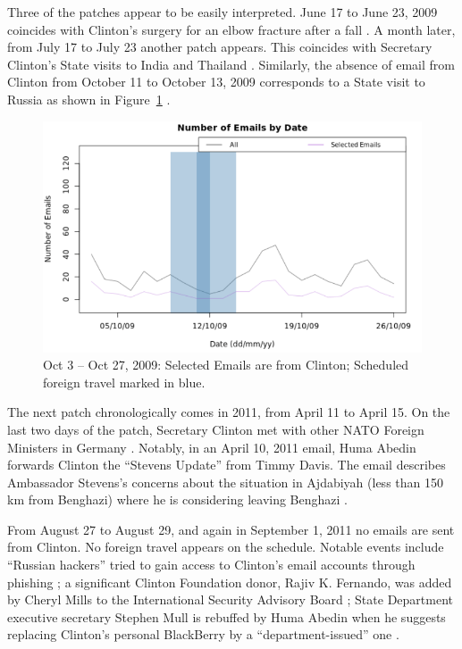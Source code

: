 \documentclass[journal]{vgtc}                %
\begin{document}
Three of the patches appear to be easily interpreted.   June 17 to June 23, 2009 coincides with Clinton's surgery for an elbow fracture after a fall \cite{ClintonFracture2009}.  A month later, from July 17 to July 23 another patch appears.  This coincides with Secretary Clinton's State visits to India and Thailand \cite{ForeignSched}.  Similarly, the absence of email from Clinton from October 11 to  October 13, 2009 corresponds to a State visit to Russia as shown in  Figure~\ref{fig:ClintonZerosOctober2009AndForeignSchedule} \cite{ForeignSched, visitRussia}.
\begin{figure}[h]
\begin{center}
\includegraphics[width=0.95\linewidth]{ClintonZerosOctober2009AndForeignSchedule}
\caption{Oct 3 -- Oct 27, 2009:  Selected Emails are from Clinton; Scheduled foreign travel marked in blue.}
\label{fig:ClintonZerosOctober2009AndForeignSchedule}
\end{center}
\end{figure}

The next patch chronologically comes in 2011, from April 11 to April 15.   On the last two days of the patch, Secretary Clinton met with other NATO Foreign Ministers in Germany \cite{ForeignSched}.   Notably, in an April 10, 2011 email, Huma Abedin forwards Clinton the ``Stevens Update'' from Timmy Davis.  The email describes Ambassador Stevens's concerns about the situation in Ajdabiyah (less than 150 km from Benghazi) where he is considering leaving Benghazi \cite{StevensUpdate}.

From August 27 to August 29, and again in September 1, 2011 no emails are sent from Clinton.   No foreign travel appears on the schedule.  Notable events include ``Russian hackers'' tried to gain access to Clinton's email accounts through phishing \cite{russianHackers2}; a significant Clinton Foundation donor, Rajiv K. Fernando, was added by Cheryl Mills to the International Security Advisory Board  \cite{clintonDonorSecurity}; State Department executive secretary Stephen Mull is rebuffed by Huma Abedin when he suggests replacing Clinton's personal BlackBerry by a ``department-issued'' one \cite{earlyEmails}.
\end{document}
